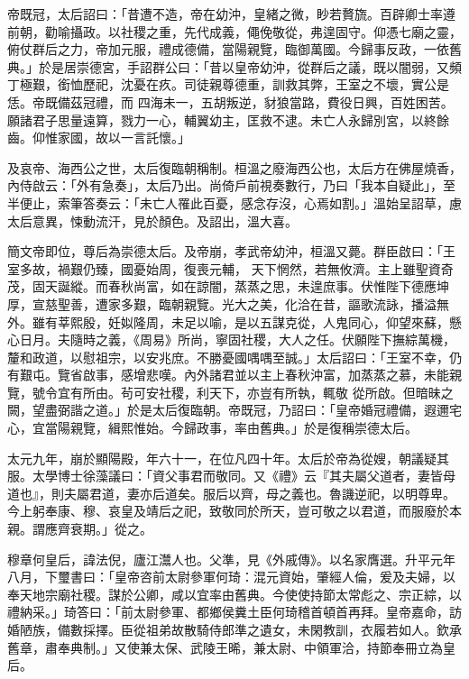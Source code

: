 \begin{pinyinscope}
 帝既冠，太后詔曰：「昔遭不造，帝在幼沖，皇緒之微，眇若贅旒。百辟卿士率遵前朝，勸喻攝政。以社稷之重，先代成義，僶俛敬從，弗遑固守。仰憑七廟之靈，俯仗群后之力，帝加元服，禮成德備，當陽親覽，臨御萬國。今歸事反政，一依舊典。」於是居崇德宮，手詔群公曰：「昔以皇帝幼沖，從群后之議，既以闇弱，又頻丁極艱，銜恤歷祀，沈憂在疚。司徒親尊德重，訓救其弊，王室之不壞，實公是恁。帝既備茲冠禮，而
 四海未一，五胡叛逆，豺狼當路，費役日興，百姓困苦。願諸君子思量遠算，戮力一心，輔翼幼主，匡救不逮。未亡人永歸別宮，以終餘齒。仰惟家國，故以一言託懷。」



 及哀帝、海西公之世，太后復臨朝稱制。桓溫之廢海西公也，太后方在佛屋燒香，內侍啟云：「外有急奏」，太后乃出。尚倚戶前視奏數行，乃曰「我本自疑此」，至半便止，索筆答奏云：「未亡人罹此百憂，感念存沒，心焉如割。」溫始呈詔草，慮太后意異，悚動流汗，見於顏色。及詔出，溫大喜。



 簡文帝即位，尊后為崇德太后。及帝崩，孝武帝幼沖，桓溫又薨。群臣啟曰：「王室多故，禍艱仍臻，國憂始周，復喪元輔，
 天下惘然，若無攸濟。主上雖聖資奇茂，固天誕縱。而春秋尚富，如在諒闇，蒸蒸之思，未遑庶事。伏惟陛下德應坤厚，宣慈聖善，遭家多艱，臨朝親覽。光大之美，化洽在昔，謳歌流詠，播溢無外。雖有莘熙殷，妊姒隆周，未足以喻，是以五謀克從，人鬼同心，仰望來蘇，懸心日月。夫隨時之義，《周易》所尚，寧固社稷，大人之任。伏願陛下撫綜萬機，釐和政道，以慰祖宗，以安兆庶。不勝憂國喁喁至誠。」太后詔曰：「王室不幸，仍有艱屯。覽省啟事，感增悲嘆。內外諸君並以主上春秋沖富，加蒸蒸之慕，未能親覽，號令宜有所由。茍可安社稷，利天下，亦豈有所執，輒敬
 從所啟。但暗昧之闕，望盡弼諧之道。」於是太后復臨朝。帝既冠，乃詔曰：「皇帝婚冠禮備，遐邇宅心，宜當陽親覽，緝熙惟始。今歸政事，率由舊典。」於是復稱崇德太后。



 太元九年，崩於顯陽殿，年六十一，在位凡四十年。太后於帝為從嫂，朝議疑其服。太學博士徐藻議曰：「資父事君而敬同。又《禮》云『其夫屬父道者，妻皆母道也』，則夫屬君道，妻亦后道矣。服后以齊，母之義也。魯譏逆祀，以明尊卑。今上躬奉康、穆、哀皇及靖后之祀，致敬同於所天，豈可敬之以君道，而服廢於本親。謂應齊衰期。」從之。



 穆章何皇后，諱法倪，廬江灊人也。父準，見《外戚傳》。以名家膺選。升平元年八月，下璽書曰：「皇帝咨前太尉參軍何琦：混元資始，肇經人倫，爰及夫婦，以奉天地宗廟社稷。謀於公卿，咸以宜率由舊典。今使使持節太常彪之、宗正綜，以禮納采。」琦答曰：「前太尉參軍、都鄉侯糞土臣何琦稽首頓首再拜。皇帝嘉命，訪婚陋族，備數採擇。臣從祖弟故散騎侍郎準之遺女，未閑教訓，衣履若如人。欽承舊章，肅奉典制。」又使兼太保、武陵王晞，兼太尉、中領軍洽，持節奉冊立為皇后。




\end{pinyinscope}
